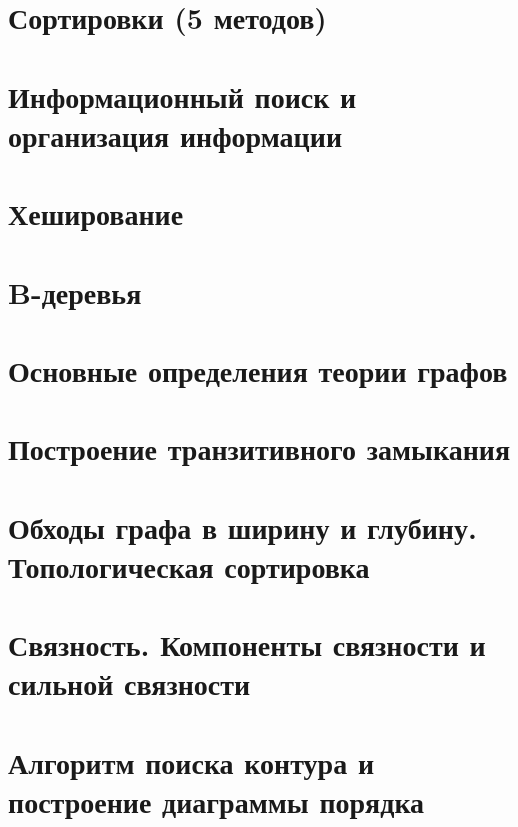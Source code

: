 \documentclass[12pt, fleqn]{article}
\begin{document}
  \section{Сортировки (5 методов)}
  \newpage

  \section{Информационный поиск и организация информации}
  \newpage

  \section{Хеширование}
  \newpage

  

  \section{B-деревья}
  \newpage

  

  \section{Основные определения теории графов}
  \newpage

  \section{Построение транзитивного замыкания}
  \newpage

  \section{Обходы графа в ширину и глубину. Топологическая сортировка}
  \newpage

  \section{Связность. Компоненты связности и сильной связности}
  \newpage

  \section{Алгоритм поиска контура и построение диаграммы порядка}
  \newpage
\end{document}
